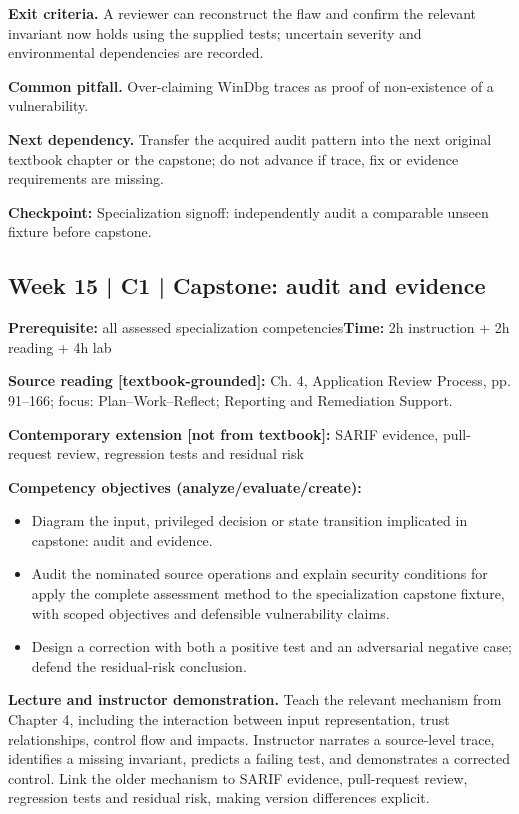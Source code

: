 \documentclass[10pt,letterpaper]{article}
\begin{document}
\textbf{Exit criteria.} A reviewer can reconstruct the flaw and confirm the relevant invariant now holds using the supplied tests; uncertain severity and environmental dependencies are recorded.

\textbf{Common pitfall.} Over-claiming WinDbg traces as proof of non-existence of a vulnerability.

\textbf{Next dependency.} Transfer the acquired audit pattern into the next original textbook chapter or the capstone; do not advance if trace, fix or evidence requirements are missing.

\begin{historynote}\textbf{Checkpoint:} Specialization signoff: independently audit a comparable unseen fixture before capstone.\end{historynote}
\subsection{Week 15 | C1 | Capstone: audit and evidence}
\textbf{Prerequisite:} all assessed specialization competencies\hfill\textbf{Time:} 2h instruction + 2h reading + 4h lab

\textbf{Source reading [textbook-grounded]:} Ch. 4, Application Review Process, pp. 91--166; focus: Plan--Work--Reflect; Reporting and Remediation Support.

\textbf{Contemporary extension [not from textbook]:} SARIF evidence, pull-request review, regression tests and residual risk

\textbf{Competency objectives (analyze/evaluate/create):}
\begin{itemize}[leftmargin=*,itemsep=2pt]
\item Diagram the input, privileged decision or state transition implicated in capstone: audit and evidence.
\item Audit the nominated source operations and explain security conditions for apply the complete assessment method to the specialization capstone fixture, with scoped objectives and defensible vulnerability claims.
\item Design a correction with both a positive test and an adversarial negative case; defend the residual-risk conclusion.
\end{itemize}
\textbf{Lecture and instructor demonstration.} Teach the relevant mechanism from Chapter 4, including the interaction between input representation, trust relationships, control flow and impacts. Instructor narrates a source-level trace, identifies a missing invariant, predicts a failing test, and demonstrates a corrected control. Link the older mechanism to SARIF evidence, pull-request review, regression tests and residual risk, making version differences explicit.
\end{document}
